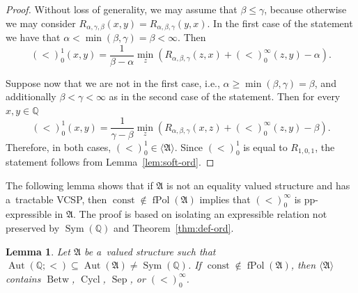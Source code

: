 \documentclass[preprint,12pt]{elsarticle}
\newcommand{\Q}{\mathbb Q}
\newcommand{\bA}{{\mathfrak A}}
\newcommand{\checked}[1]{#1}
\DeclareMathOperator{\Cyc}{Cycl}
\DeclareMathOperator{\Aut}{Aut}
\DeclareMathOperator{\fPol}{fPol}
\DeclareMathOperator{\Sym}{Sym}
\DeclareMathOperator{\const}{const}
\DeclareMathOperator{\Betw}{Betw}
\DeclareMathOperator{\Sep}{Sep}
\newtheorem{lemma}[theorem]{Lemma}
\begin{document}
\begin{proof}
Without loss of generality, we may assume that $\beta \leq \gamma$, because otherwise we may consider $R_{\alpha, \gamma, \beta}(x,y) = R_{\alpha, \beta, \gamma} (y,x)$.
%
In the first case of the statement we have that $\alpha < \min(\beta, \gamma) = \beta < \infty$. Then
\[(<)_0^1(x,y) = \frac{1}{\beta-\alpha} \min_{z} \left( R_{\alpha, \beta, \gamma}(z,x) + (<)_0^\infty(z,y) - \alpha \right).\]

Suppose now that we are not in the first case, i.e., $\alpha \geq \min(\beta, \gamma) = \beta$, and additionally
$\beta < \gamma < \infty$ 
as in the second case of the statement.
Then for every $x,y \in \Q$
\[(<)_0^1(x,y)= \frac{1}{\gamma - \beta} \min_{z} \left( R_{\alpha, \beta, \gamma}(x,z) + (<)_0^\infty(z,y) - \beta \right).\]
Therefore, in both cases, $(<)_0^1 \in \langle \bA \rangle$. Since $(<)_0^1$ is equal to $R_{1,0,1}$, the statement follows from Lemma~\ref{lem:soft-ord}.
\end{proof}

\checked{The following lemma shows that if $\bA$ is not an equality valued structure and has a~tractable VCSP, then $\const \notin \fPol(\bA)$ implies that $(<)_0^\infty$ is pp-expressible in $\bA$. The proof is based on isolating an expressible relation not preserved by $\Sym(\Q)$ and Theorem~\ref{thm:def-ord}.}

\begin{lemma} \label{lem:expr-ord}
Let $\bA$ be a~valued structure such that $\Aut(\Q; <)\subseteq \Aut(\bA) \neq \Sym(\Q)$.
If $\const \notin \fPol(\bA)$, 
then $\langle\bA\rangle$ contains  
$\Betw$, $\Cyc$, $\Sep$, 
or $(<)_0^\infty$. 
\end{lemma}
\end{document}
